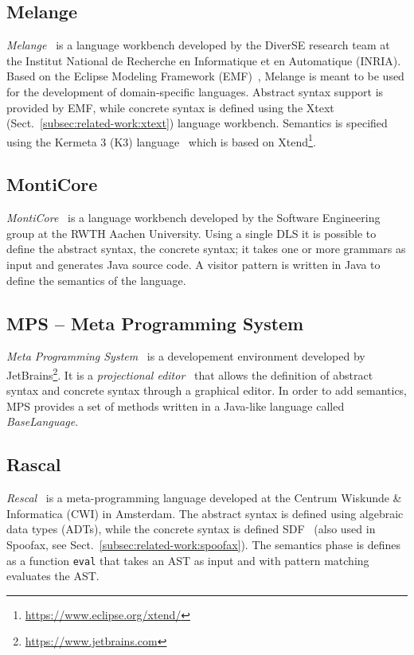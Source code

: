 \subsection{Melange}\label{subsec:related-work:melange}
\textit{Melange}~\cite{Degueule15}  is a language workbench developed by the DiverSE research team at the Institut National de Recherche en Informatique et en Automatique (INRIA). Based on the Eclipse Modeling Framework (EMF)~\cite{Steinberg08}, Melange is meant to be used for the development of domain-specific languages. Abstract syntax support is provided by EMF, while concrete syntax is defined using the Xtext (Sect.~\ref{subsec:related-work:xtext}) language workbench.
Semantics is specified using the Kermeta 3 (K3) language~\cite{Jezequel15} which is based on Xtend\footnote{\url{https://www.eclipse.org/xtend/}}.

\subsection{MontiCore}\label{subsec:related-work:monticore}
\textit{MontiCore}~\cite{Krahn10} is a language workbench developed by the Software Engineering group at the RWTH Aachen University. Using a single DLS it is possible to define the abstract syntax, the concrete syntax; it takes one or more grammars as input and generates Java source code.
A visitor pattern is written in Java to define the semantics of the language.

\subsection{MPS -- Meta Programming System}\label{subsec:related-work:mps}
\textit{Meta Programming System}~\cite{Volter11, Voelter12} is a developement environment developed by JetBrains\footnote{\url{https://www.jetbrains.com}}. It is a \textit{projectional editor}~\cite{Voelter14} that allows the definition of abstract syntax and concrete syntax through a graphical editor. In order to add semantics, MPS provides a set of methods written in a Java-like language called \textit{BaseLanguage}.

\subsection{Rascal}\label{subsec:related-work:rascal}

\textit{Rescal}~\cite{Klint09b} is a meta-programming language developed at the Centrum Wiskunde \& Informatica (CWI) in Amsterdam. The abstract syntax is defined using algebraic data types (ADTs), while the concrete syntax is defined SDF~\cite{Heering89c} (also used in Spoofax, see Sect.~\ref{subsec:related-work:spoofax}). The semantics phase is defines as a function \texttt{eval} that takes an AST as input and with pattern matching evaluates the AST.

